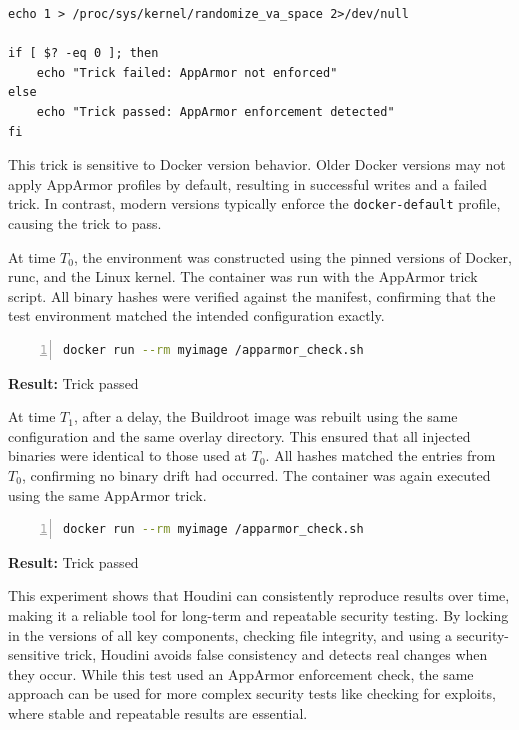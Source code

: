 \documentclass[12pt]{report}
\begin{document}
\begin{doublespace}
\begin{lstlisting}
echo 1 > /proc/sys/kernel/randomize_va_space 2>/dev/null

if [ $? -eq 0 ]; then
    echo "Trick failed: AppArmor not enforced"
else
    echo "Trick passed: AppArmor enforcement detected"
fi
\end{lstlisting}

This trick is sensitive to Docker version behavior. Older Docker versions may not apply AppArmor profiles by default, resulting in successful writes and a failed trick. In contrast, modern versions typically enforce the \texttt{docker-default} profile, causing the trick to pass.


At time \( T_0 \), the environment was constructed using the pinned versions of Docker, runc, and the Linux kernel. The container was run with the AppArmor trick script. All binary hashes were verified against the manifest, confirming that the test environment matched the intended configuration exactly. 

\begin{lstlisting}[language=bash, caption={Running the AppArmor Trick in a Container}, label={lst:run-apparmor-trick}, numbers=left, numberstyle=\tiny, stepnumber=1, frame=single, breaklines=true, backgroundcolor=\color{gray!10}, basicstyle=\ttfamily\footnotesize, showspaces=false, showstringspaces=false]
docker run --rm myimage /apparmor_check.sh
\end{lstlisting}

\noindent\textbf{Result:} Trick passed


At time \( T_1 \), after a delay, the Buildroot image was rebuilt using the same configuration and the same overlay directory. This ensured that all injected binaries were identical to those used at \( T_0 \). All hashes matched the entries from \( T_0 \), confirming no binary drift had occurred. The container was again executed using the same AppArmor trick.

\begin{lstlisting}[language=bash, caption={Running the AppArmor Trick in a Container (\( T_1 \))}, label={lst:run-apparmor-trick-t1}, numbers=left, numberstyle=\tiny, stepnumber=1, frame=single, breaklines=true, backgroundcolor=\color{gray!10}, basicstyle=\ttfamily\footnotesize, showspaces=false, showstringspaces=false]
docker run --rm myimage /apparmor_check.sh
\end{lstlisting}

\noindent\textbf{Result:} Trick passed

This experiment shows that Houdini can consistently reproduce results over time, making it a reliable tool for long-term and repeatable security testing. By locking in the versions of all key components, checking file integrity, and using a security-sensitive trick, Houdini avoids false consistency and detects real changes when they occur. While this test used an AppArmor enforcement check, the same approach can be used for more complex security tests like checking for exploits, where stable and repeatable results are essential.


\end{doublespace}
\end{document}
